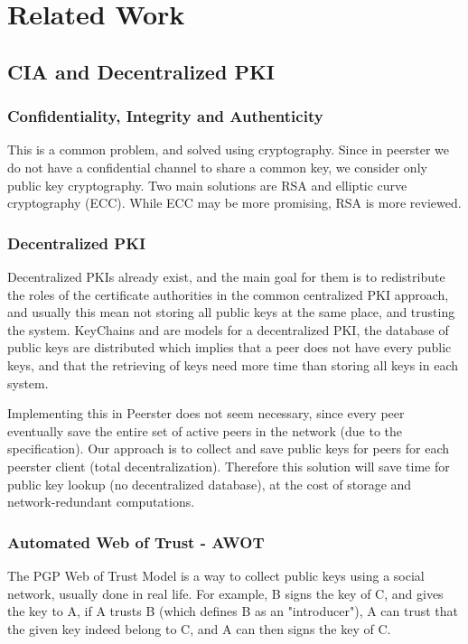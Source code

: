 \documentclass[]{article}
\begin{document}
\section{Related Work}

\subsection{CIA and Decentralized PKI}

\subsubsection{Confidentiality, Integrity and Authenticity}
This is a common problem, and solved using cryptography. Since in peerster we do not have a confidential channel to share a common key, we consider only public key cryptography. Two main solutions are RSA \cite{RFC8017} and elliptic curve cryptography (ECC). While ECC may be more promising, RSA is more reviewed.

\subsubsection{Decentralized PKI}
Decentralized PKIs already exist, and the main goal for them is to redistribute the roles of the certificate authorities in the common centralized PKI approach, and usually this mean not storing all public keys at the same place, and trusting the system. KeyChains \cite{morselli2006keychains} and \cite{aberer2005decentralised} are models for a decentralized PKI, the database of public keys are distributed which implies that a peer does not have every public keys, and that the retrieving of keys need more time than storing all keys in each system.

Implementing this in Peerster does not seem necessary, since every peer eventually save the entire set of active peers in the network (due to the specification). Our approach is to collect and save public keys for peers for each peerster client (total decentralization). Therefore this solution will save time for public key lookup (no decentralized database), at the cost of storage and network-redundant computations.

\subsubsection{Automated Web of Trust - AWOT}
\label{sec:related-work-wot}

The PGP Web of Trust Model \cite{abdul1997pgp} is a way to collect public keys using a social network, usually done in real life. For example, B signs the key of C, and gives the key to A, if A trusts B (which defines B as an "introducer"), A can trust that the given key indeed belong to C, and A can then signs the key of C. 
\end{document}
